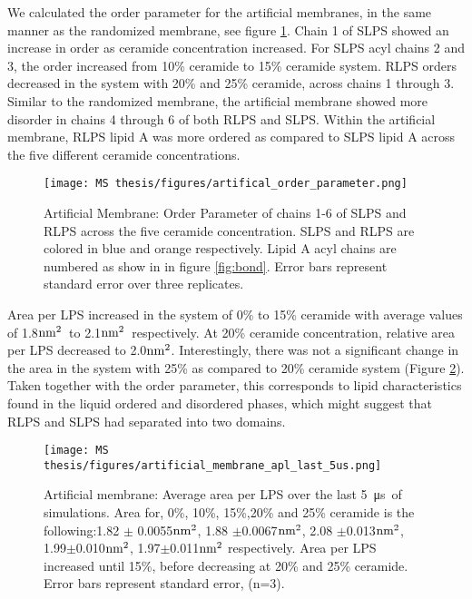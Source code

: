 \documentclass[10pt, letterpaper]{article}
\begin{document}
We calculated the order parameter for the artificial membranes, in the same manner as the randomized membrane, see figure \ref{fig:art_order}. Chain 1 of SLPS showed an increase in order as ceramide concentration increased. For SLPS acyl chains 2 and 3, the order increased from 10\% ceramide to 15\% ceramide system.
RLPS orders decreased in the system with 20\% and 25\% ceramide, across chains 1 through 3. Similar to the randomized membrane, the artificial membrane showed more disorder in chains 4 through 6 of both  RLPS and SLPS. Within the artificial membrane, RLPS lipid A was more ordered as compared to SLPS lipid A across the five different ceramide concentrations. 


\begin{figure}[H]
  \centerline{\texttt{[image: MS thesis/figures/artifical\_order\_parameter.png]}}
  \caption[Artificial Membrane: Order Parameter]{Artificial Membrane: Order Parameter of chains 1-6 of SLPS and RLPS across the five ceramide concentration. SLPS and RLPS are colored in blue and orange respectively. Lipid A acyl chains are numbered as show in in figure \ref{fig:bond}. Error bars represent standard error over three replicates.}\label{fig:art_order}
\end{figure}

Area per LPS increased in the system of 0\% to 15\% ceramide with average values of 1.8$\rm nm^2$~to 2.1$\rm nm^2$~respectively. At 20\% ceramide concentration, relative area per LPS decreased to 2.0$\rm nm^2$. Interestingly, there was not a significant change in the area in the system with 25\% as compared to 20\% ceramide system (Figure \ref{fig:art_apl}). Taken together with the order parameter, this corresponds to lipid characteristics found in the liquid ordered and disordered phases, which might suggest that RLPS and SLPS had separated into two domains.

\begin{figure}[H]
  \centerline{\texttt{[image: MS thesis/figures/artificial\_membrane\_apl\_last\_5us.png]}}
  \caption[Artificial Membrane: Area per LPS]{Artificial membrane: Average area per LPS over the last \SI{5}{\micro\second}~of simulations. Area for, 0\%, 10\%, 15\%,20\% and 25\% ceramide is the following:1.82 $\pm$ 0.0055$\rm nm^2$, 1.88 $\pm$0.0067$\rm nm^2$, 2.08 $\pm$0.013$\rm nm^2$, 1.99$\pm$0.010$\rm nm^2$, 1.97$\pm$0.011$\rm nm^2$ respectively. Area per LPS increased until 15\%, before decreasing at 20\% and 25\% ceramide. Error bars represent standard error, (n=3).}\label{fig:art_apl}
\end{figure}
\end{document}
